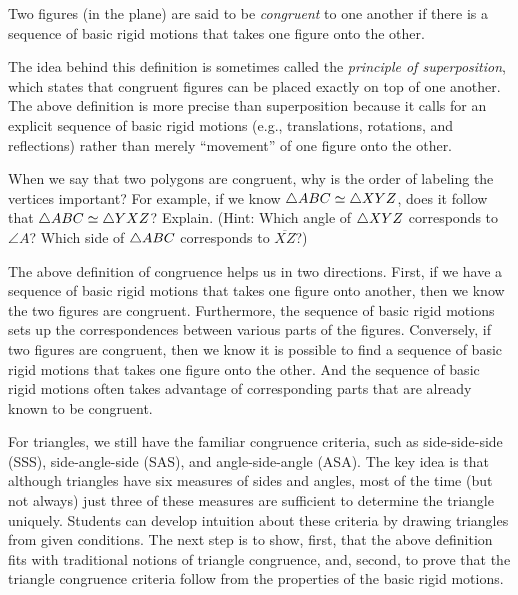 \begin{definition}
Two figures (in the plane) are said to be \emph{congruent} to one another if there is a sequence of basic rigid motions that takes one figure onto the other.  
\end{definition}

The idea behind this definition is sometimes called the \emph{principle of superposition}, which states that congruent figures can be placed exactly on top of one another.  The above definition is more precise than superposition because it calls for an explicit sequence of basic rigid motions (e.g., translations, rotations, and reflections) rather than merely ``movement'' of one figure onto the other.  

\begin{question}
When we say that two polygons are congruent, why is the order of labeling the vertices important?  For example, if we know $\triangle ABC \simeq \triangle XYZ$, does it follow that $\triangle ABC \simeq \triangle YXZ$?  Explain.  (Hint:  Which angle of $\triangle XYZ$ corresponds to $\angle A$?  Which side of $\triangle ABC$ corresponds to $\overline{XZ}$?)
\end{question}
\QM

The above definition of congruence helps us in two directions.  First, if we have a sequence of basic rigid motions that takes one figure onto another, then we know the two figures are congruent.  Furthermore, the sequence of basic rigid motions sets up the correspondences between various parts of the figures.  Conversely, if two figures are congruent, then we know it is possible to find a sequence of basic rigid motions that takes one figure onto the other.  And the sequence of basic rigid motions often takes advantage of corresponding parts that are already known to be congruent. 

For triangles, we still have the familiar congruence criteria, such as side-side-side (SSS), side-angle-side (SAS), and angle-side-angle (ASA).  The key idea is that although triangles have six measures of sides and angles, most of the time (but not always) just three of these measures are sufficient to determine the triangle uniquely.  Students can develop intuition about these criteria by drawing triangles from given conditions.  The next step is to show, first, that the above definition fits with traditional notions of triangle congruence, and, second, to prove that the triangle congruence criteria follow from the properties of the basic rigid motions.

